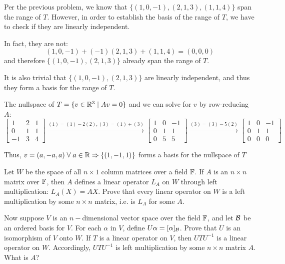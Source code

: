 \documentclass[a4paper, 10pt]{article}
\begin{document}
\begin{solution}
    Per the previous problem, we know that \(\{(1, 0, -1), (2, 1, 3), (1, 1, 4)\}\) span the range of \(T\). However, in order to establish the basis of the range of \(T\), we have to check if they are linearly independent.

    In fact, they are not:
    \[
        (1, 0, -1) + (-1)(2, 1, 3) + (1, 1, 4) = (0, 0, 0)
    \]
    and therefore \(\{(1, 0, -1), (2, 1, 3)\}\) already span the range of \(T\).

    It is also trivial that \(\{(1, 0, -1), (2, 1, 3)\}\) are linearly independent, and thus they form a basis for the range of \(T\).

    The nullspace of \(T = \{v \in \mathbb{R}^3 \mid Av = 0\}\) and we can solve for \(v\) by row-reducing \(A\):
    \[
        \left[\begin{array}{ccc}
                1  & 2 & 1 \\
                0  & 1 & 1 \\
                -1 & 3 & 4
            \end{array}\right] \xrightarrow{(1) = (1) - 2(2), (3) = (1) + (3)} \left[\begin{array}{ccc}
                1 & 0 & -1 \\
                0 & 1 & 1  \\
                0 & 5 & 5
            \end{array}\right] \xrightarrow{(3) = (3) - 5(2)} \left[\begin{array}{ccc}
                1 & 0 & -1 \\
                0 & 1 & 1  \\
                0 & 0 & 0
            \end{array}\right]
    \]

    Thus, \(v = (a, -a, a) \forall a \in \bbr \implies \{(1, -1, 1)\}\) forms a basis for the nullspace of \(T\)
\end{solution}
\begin{problem} 
Let \(W\) be the space of all \(n \times 1\) column matrices over a field \(\mathbb{F}\). If \(A\) is an \(n \times n\) matrix over \(\mathbb{F}\), then \(A\) defines a linear operator \(L_A\) on \(W\) through left multiplication: \(L_A(X) = AX\). Prove that every linear operator on \(W\) is a left multiplication by some \(n \times n \) matrix, i.e. is \(L_A\) for some \(A\).

Now suppose \(V\) is an \(n-\)dimensional vector space over the field \(\mathbb{F}\), and let \(\mathcal{B}\) be an ordered basis for \(V\). For each \(\alpha\) in \(V\), define \(U\alpha = [\alpha]_{\mathcal{B}}\). Prove that \(U\) is an isomorphism of \(V\) onto \(W\).
If \(T\) is a linear operator on \(V\), then \(UTU^{-1}\) is a linear operator on \(W\). Accordingly, \(UTU^{-1}\) is left multiplication by some \(n \times n\) matrix \(A\). What is \(A\)?
\end{problem}
\end{document}
